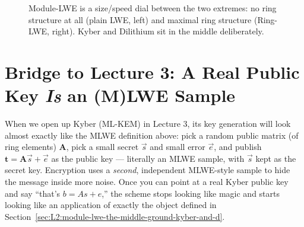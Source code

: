 \begin{figure}[h]
\centering
{}
\caption{Module-LWE is a size/speed dial between the two extremes: no ring structure at all (plain LWE, left) and maximal ring structure (Ring-LWE, right). Kyber and Dilithium sit in the middle deliberately.}
\label{fig:mlwe-dial}
\end{figure}

\section{Bridge to Lecture 3: A Real Public Key \emph{Is} an (M)LWE Sample}
\label{sec:L2:bridge-to-session-3-a-real-public-key-is}

When we open up Kyber (ML-KEM) in Lecture 3, its key generation will look almost exactly like the MLWE definition above: pick a random public matrix (of ring elements) $\mathbf{A}$, pick a small secret $\vec s$ and small error $\vec e$, and publish $\mathbf{t} = \mathbf{A}\vec s + \vec e$ as the public key --- literally an MLWE sample, with $\vec s$ kept as the secret key. Encryption uses a \emph{second}, independent MLWE-style sample to hide the message inside more noise. Once you can point at a real Kyber public key and say ``that's $b = As+e$,'' the scheme stops looking like magic and starts looking like an application of exactly the object defined in Section~\ref{sec:L2:module-lwe-the-middle-ground-kyber-and-d}.

